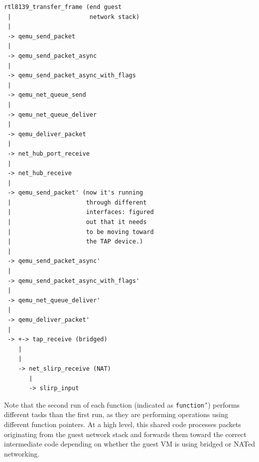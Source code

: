 \documentclass[letterpaper,twocolumn,11pt]{article}
\begin{document}
\begin{verbatim}
rtl8139_transfer_frame (end guest 
 |                      network stack)
 |
 -> qemu_send_packet
 |
 -> qemu_send_packet_async
 |
 -> qemu_send_packet_async_with_flags
 |
 -> qemu_net_queue_send
 |
 -> qemu_net_queue_deliver
 |
 -> qemu_deliver_packet
 |
 -> net_hub_port_receive
 |
 -> net_hub_receive
 |
 -> qemu_send_packet' (now it's running 
 |                     through different 
 |                     interfaces: figured 
 |                     out that it needs  
 |                     to be moving toward 
 |                     the TAP device.)
 |
 -> qemu_send_packet_async'
 |
 -> qemu_send_packet_async_with_flags'
 |
 -> qemu_net_queue_deliver'
 |
 -> qemu_deliver_packet'
 |
 -> +-> tap_receive (bridged)
    |
    |
    -> net_slirp_receive (NAT)
       |
       -> slirp_input 
\end{verbatim}

Note that the second run of each function (indicated as \texttt{function'}) performs different tasks than the first run, as they are performing operations using different function pointers. At a high level, this shared code processes packets originating from the guest network stack and forwards them toward the correct intermediate code depending on whether the guest VM is using bridged or NATed networking.

%
%
%
%
%
%
%








{\footnotesize 
}
\end{document}
